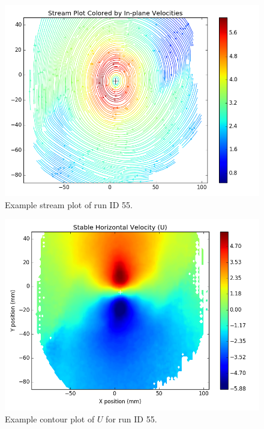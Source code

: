 \begin{figure}[H]
	\centering
	\includegraphics[width=5in]{figs/example_vortex_figs/example_stream}
	\caption{Example stream plot of run ID 55.}
	\label{fig:examp_stream}
\end{figure}

\begin{figure}[H]
	\centering
	\includegraphics[width=5in]{figs/example_vortex_figs/example_U_contour}
\caption{Example contour plot of $U$ for run ID 55.}
\label{fig:examp_U}
\end{figure}

